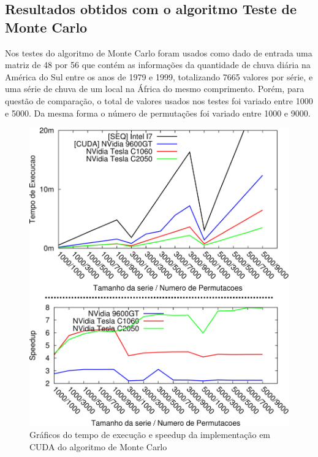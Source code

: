 \subsection{Resultados obtidos com o algoritmo Teste de Monte Carlo}

Nos testes do algoritmo de Monte Carlo foram usados como dado de entrada uma matriz de 48 por 56 que contém as informações da quantidade de chuva diária na América do Sul entre os anos de 1979 e 1999, totalizando 7665 valores por série, e uma série de chuva de um local na África do mesmo comprimento.
Porém, para questão de comparação, o total de valores usados nos testes foi variado entre 1000 e 5000. Da mesma forma o número de permutações foi variado entre 1000 e 9000.

\begin{figure}[H]
\centering
\includegraphics[]{Imagens/graficos_mcarlo/mcarlo_cuda.png}
\caption{Gráficos do tempo de execução e speedup da implementação em CUDA do algoritmo de Monte Carlo}
\label{fig:graficos_mcarlo_cuda}
\end{figure}


